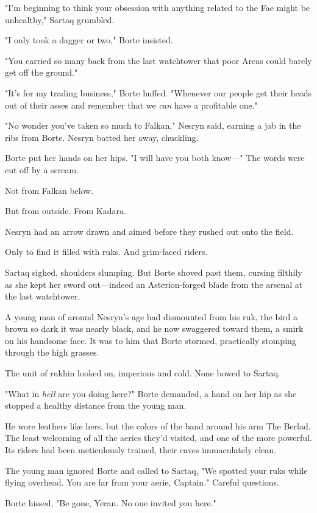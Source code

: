 "I'm beginning to think your obsession with anything related to the Fae might be unhealthy," Sartaq grumbled.

"I only took a dagger or two," Borte insisted.

"You carried so many back from the last watchtower that poor Arcas could barely get off the ground."

"It's for my trading business," Borte huffed.
"Whenever our people get their heads out of their asses and remember that we \emph{can} have a profitable one."

"No wonder you've taken so much to Falkan," Nesryn said, earning a jab in the ribs from Borte.
Nesryn batted her away, chuckling.

Borte put her hands on her hips.
"I will have you both know---" The words were cut off by a scream.

Not from Falkan below.

But from outside.
From Kadara.

Nesryn had an arrow drawn and aimed before they rushed out onto the field.

Only to find it filled with ruks.
And grim-faced riders.

Sartaq sighed, shoulders slumping.
But Borte shoved past them, cursing filthily as she kept her sword out---indeed an Asterion-forged blade from the arsenal at the last watchtower.

A young man of around Nesryn's age had dismounted from his ruk, the bird a brown so dark it was nearly black, and he now swaggered toward them, a smirk on his handsome face.
It was to him that Borte stormed, practically stomping through the high grasses.

The unit of rukhin looked on, imperious and cold.
None bowed to Sartaq.

"What in \emph{hell} are you doing here?"
Borte demanded, a hand on her hip as she stopped a healthy distance from the young man.

He wore leathers like hers, but the colors of the band around his arm  The Berlad.
The least welcoming of all the aeries they'd visited, and one of the more powerful.
Its riders had been meticulously trained, their caves immaculately clean.

The young man ignored Borte and called to Sartaq, "We spotted your ruks while flying overhead.
You are far from your aerie, Captain."
Careful questions.

Borte hissed, "Be gone, Yeran.
No one invited you here."

